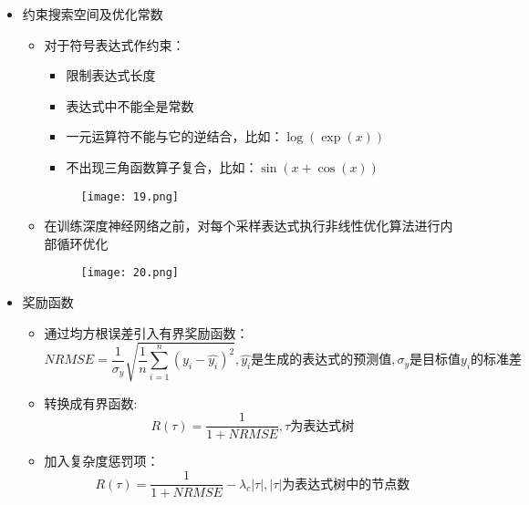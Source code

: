 \documentclass[CJK,aspectratio=169]{beamer}  %
\begin{document}
	\begin{frame}
		\begin{itemize}
			\item 约束搜索空间及优化常数
			\begin{itemize}
				\item 对于符号表达式作约束：
				\begin{itemize}
					\item 限制表达式长度
					\item 表达式中不能全是常数
					\item 一元运算符不能与它的逆结合，比如：$\log(\exp(x))$
					\item 不出现三角函数算子复合，比如：$\sin(x+\cos(x))$
				\end{itemize}
				\begin{figure}
					\centering
					\texttt{[image: 19.png]}
				\end{figure}
				\item 在训练深度神经网络之前，对每个采样表达式执行非线性优化算法进行内部循环优化
				\begin{figure}
					\centering
					\texttt{[image: 20.png]}
				\end{figure}
			\end{itemize}
		\end{itemize}
	\end{frame}
	\begin{frame}
		\begin{itemize}
			\item 奖励函数
			\begin{itemize}
				\item 通过均方根误差引入有界奖励函数：
				$$NRMSE=\frac{1}{\sigma_y}\sqrt{\frac{1}{n}\sum_{i=1}^{n}(y_i-\hat{y_i})^2},\hat{y_i}\text{是生成的表达式的预测值},\sigma_y\text{是目标值$y_i$的标准差}$$
				\item 转换成有界函数:
				$$R(\tau)=\frac{1}{1+NRMSE},\tau\text{为表达式树}$$
				\item 加入复杂度惩罚项：
				$$R(\tau)=\frac{1}{1+NRMSE}-\lambda_c|\tau|,|\tau|\text{为表达式树中的节点数}$$
			\end{itemize}
		\end{itemize}
	\end{frame} 
\end{document}
